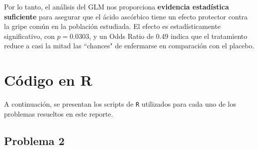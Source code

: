 \begin{tcolorbox}
Por lo tanto, el análisis del GLM nos proporciona \textbf{evidencia estadística suficiente} para asegurar que el ácido ascórbico tiene un efecto protector contra la gripe común en la población estudiada. El efecto es estadísticamente significativo, con $p = 0.0303$, y un Odds Ratio de 0.49 indica que el tratamiento reduce a casi la mitad las ``chances" de enfermarse en comparación con el placebo.
\end{tcolorbox}

\newpage

\appendix  
\section{Código en \textcolor{CIMATRed}{R}}

A continuación, se presentan los scripts de \texttt{R} utilizados para cada uno de los problemas resueltos en este reporte.


\subsection{Problema \textcolor{CIMATRed}{2}}

